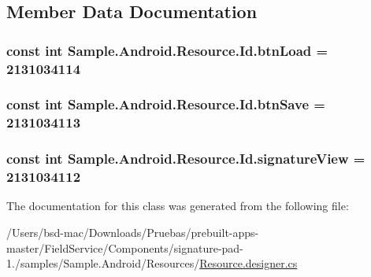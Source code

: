\subsection{Member Data Documentation}
\hypertarget{class_sample_1_1_android_1_1_resource_1_1_id_a873e8ab856b0b0c4d9ee293f6cca389c}{
\subsubsection[{btn\+Load}]{\setlength{\rightskip}{0pt plus 5cm}const int Sample.\+Android.\+Resource.\+Id.\+btn\+Load = 2131034114}}\label{class_sample_1_1_android_1_1_resource_1_1_id_a873e8ab856b0b0c4d9ee293f6cca389c}
\hypertarget{class_sample_1_1_android_1_1_resource_1_1_id_a31c70aa1efe666f624c7b87afccd24be}{
\subsubsection[{btn\+Save}]{\setlength{\rightskip}{0pt plus 5cm}const int Sample.\+Android.\+Resource.\+Id.\+btn\+Save = 2131034113}}\label{class_sample_1_1_android_1_1_resource_1_1_id_a31c70aa1efe666f624c7b87afccd24be}
\hypertarget{class_sample_1_1_android_1_1_resource_1_1_id_af6df959e12d198ba5375f6c40205c226}{
\subsubsection[{signature\+View}]{\setlength{\rightskip}{0pt plus 5cm}const int Sample.\+Android.\+Resource.\+Id.\+signature\+View = 2131034112}}\label{class_sample_1_1_android_1_1_resource_1_1_id_af6df959e12d198ba5375f6c40205c226}


The documentation for this class was generated from the following file\+:\begin{DoxyCompactItemize}
\item 
/\+Users/bsd-\/mac/\+Downloads/\+Pruebas/prebuilt-\/apps-\/master/\+Field\+Service/\+Components/signature-\/pad-\/1./samples/\+Sample.\+Android/\+Resources/\hyperlink{_components_2signature-pad-1_82_2samples_2_sample_8_android_2_resources_2_resource_8designer_8cs}{Resource.\+designer.\+cs}\end{DoxyCompactItemize}
